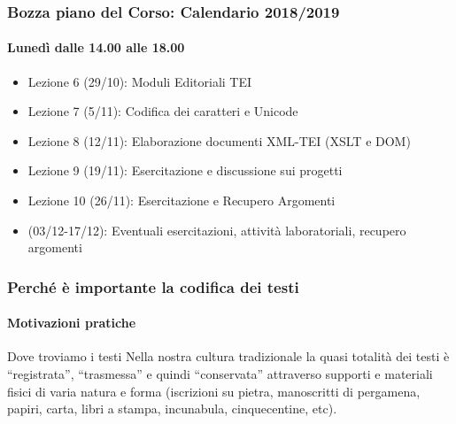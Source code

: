 \begin{frame}
    \frametitle{Bozza piano del Corso: Calendario 2018/2019}
    \framesubtitle{Lunedì dalle 14.00 alle 18.00}
    \addtocounter{nframe}{1}
    
        \begin{itemize}
            \setlength\itemsep{0.5em}
            \item Lezione 6 (29/10): Moduli Editoriali TEI
            \item Lezione 7 (5/11): Codifica dei caratteri e Unicode
            \item Lezione 8 (12/11): Elaborazione documenti XML-TEI (XSLT e DOM)
            \item Lezione 9 (19/11): Esercitazione e discussione sui progetti 
            \item Lezione 10 (26/11): Esercitazione e Recupero Argomenti
            \item (03/12-17/12):  Eventuali esercitazioni, attività laboratoriali, recupero argomenti
        \end{itemize}

\end{frame}

\begin{frame}
    \frametitle{Perché è importante la codifica dei testi}
    \framesubtitle{Motivazioni pratiche}
    \addtocounter{nframe}{1}
    
    \begin{block}{Dove troviamo i testi}
        Nella nostra cultura tradizionale la quasi totalità dei testi è ``registrata'', ``trasmessa'' e quindi ``conservata'' attraverso supporti e materiali fisici di varia natura e forma (iscrizioni su pietra, manoscritti di pergamena, papiri, carta, libri a stampa, incunabula, cinquecentine, etc).
    \end{block}

\end{frame}

